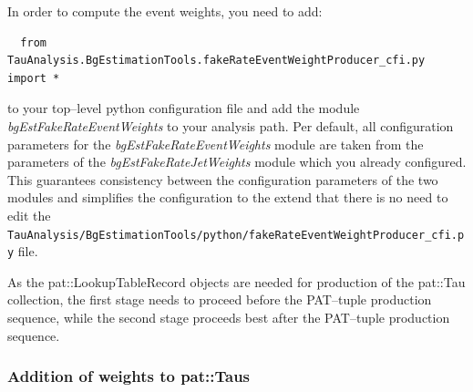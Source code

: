 In order to compute the event weights, you need to add:
\begin{small}
\begin{verbatim}
  from TauAnalysis.BgEstimationTools.fakeRateEventWeightProducer_cfi.py import *
\end{verbatim}
\end{small}
to your top--level python configuration file and add the module {\it bgEstFakeRateEventWeights} to your analysis path.
Per default, all configuration parameters for the {\it bgEstFakeRateEventWeights} module are taken
from the parameters of the {\it bgEstFakeRateJetWeights} module which you already configured.
This guarantees consistency between the configuration parameters of the two modules and simplifies the configuration
to the extend that there is no need to edit the \newline
\verb|TauAnalysis/BgEstimationTools/python/fakeRateEventWeightProducer_cfi.py| file.

As the pat::LookupTableRecord objects are needed for production of the pat::Tau collection,
the first stage needs to proceed before the PAT--tuple production sequence,
while the second stage proceeds best after the PAT--tuple production sequence.

\subsubsection{Addition of weights to pat::Taus}

